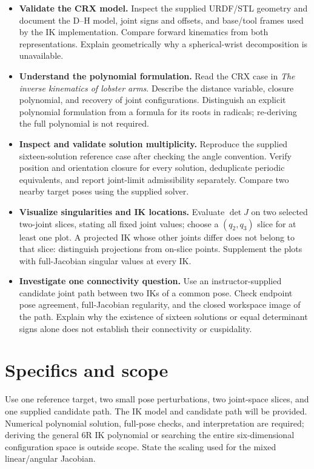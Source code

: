 \documentclass[11pt,a4paper]{article}
\begin{document}
\begin{itemize}
  \item \textbf{Validate the CRX model.} Inspect the supplied URDF/STL geometry and
document the D--H model, joint signs and offsets, and base/tool frames used by
the IK implementation. Compare forward kinematics from both representations.
Explain geometrically why a spherical-wrist decomposition is unavailable.

  \item \textbf{Understand the polynomial formulation.} Read the CRX case in
\emph{The inverse kinematics of lobster arms}. Describe the distance variable,
closure polynomial, and recovery of joint configurations. Distinguish an
explicit polynomial formulation from a formula for its roots in radicals;
re-deriving the full polynomial is not required.

  \item \textbf{Inspect and validate solution multiplicity.} Reproduce the supplied
sixteen-solution reference case after checking the angle convention. Verify
position and orientation closure for every solution, deduplicate periodic
equivalents, and report joint-limit admissibility separately. Compare two
nearby target poses using the supplied solver.

  \item \textbf{Visualize singularities and IK locations.} Evaluate $\det J$ on two
selected two-joint slices, stating all fixed joint values; choose a
$(q_2,q_3)$ slice for at least one plot. A projected IK whose other joints differ
does not belong to that slice: distinguish projections from on-slice points.
Supplement the plots with full-Jacobian singular values at every IK.

  \item \textbf{Investigate one connectivity question.} Use an instructor-supplied
candidate joint path between two IKs of a common pose. Check endpoint pose
agreement, full-Jacobian regularity, and the closed workspace image of the
path. Explain why the existence of sixteen solutions or equal determinant
signs alone does not establish their connectivity or cuspidality.
\end{itemize}

\newpage
\section*{Specifics and scope}
Use one reference target, two small pose perturbations, two joint-space
slices, and one supplied candidate path. The IK model and candidate path will
be provided. Numerical polynomial solution, full-pose checks, and interpretation
are required; deriving the general 6R IK polynomial or searching the entire
six-dimensional configuration space is outside scope. State the scaling used
for the mixed linear/angular Jacobian.
\end{document}
